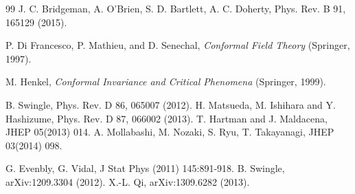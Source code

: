 \documentclass[aps,prl,twocolumn,showpacs,superscriptaddress,floatfix,10pt]{revtex4-1}
\begin{document}
\begin{thebibliography}{99}
J. C. Bridgeman, A. O'Brien, S. D. Bartlett, A. C. Doherty, 
Phys. Rev. B 91, 165129 (2015). %

%

P. Di Francesco, P. Mathieu, and D. Senechal, \textit{Conformal Field Theory} (Springer, 1997).

M. Henkel, \textit{Conformal Invariance and Critical Phenomena} (Springer, 1999).

B. Swingle, 
Phys. Rev. D 86, 065007 (2012). %
%
H. Matsueda, M. Ishihara and Y. Hashizume,  
Phys. Rev. D 87, 066002 (2013). %
%
T. Hartman and J. Maldacena, 
JHEP 05(2013) 014. %
%
A. Mollabashi, M. Nozaki, S. Ryu, T. Takayanagi,
JHEP 03(2014) 098. %

G. Evenbly, G. Vidal, 
J Stat Phys (2011) 145:891-918. %
%
B. Swingle, 
arXiv:1209.3304 (2012).
%
X.-L. Qi,
arXiv:1309.6282 (2013). 

%
%
%
% 


\end{thebibliography}
\end{document}
